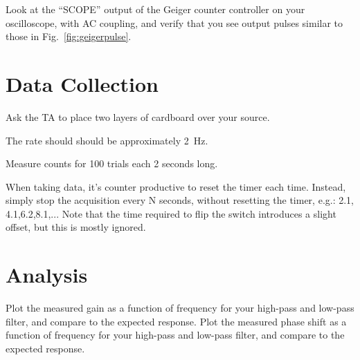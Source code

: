 Look at the ``SCOPE'' output of the Geiger counter controller on your oscilloscope, with AC coupling, and verify that you see output pulses similar to those in Fig.~\ref{fig:geigerpulse}.



\section{Data Collection}

Ask the TA to place two layers of cardboard over your source.  

The rate should should be approximately 2~\rm Hz.

Measure counts for 100 trials each 2 seconds long.

When taking data, it's counter productive to reset the timer each
time.  Instead, simply stop the acquisition every N seconds, without
resetting the timer, e.g.: 2.1, 4.1,6.2,8.1,...  Note that the time
required to flip the switch introduces a slight offset, but this is
mostly ignored.








\section{Analysis}

Plot the measured gain as a function of frequency for your high-pass
and low-pass filter, and compare to the expected response.  Plot the
measured phase shift as a function of frequency for your high-pass and
low-pass filter, and compare to the expected response.

